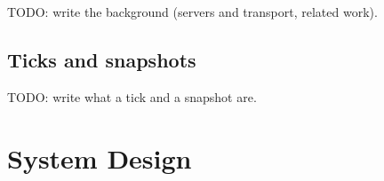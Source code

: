 \IfFileExists{IEEEtran.cls}{\ieeetrue\documentclass[conference]{IEEEtran}}{\ieeefalse\documentclass[twocolumn,10pt]{article}}
\begin{document}
%
%
TODO: write the background (servers and transport, related work).

\subsection{Ticks and snapshots}
TODO: write what a tick and a snapshot are.

\section{System Design}\label{sec:design}
\end{document}
